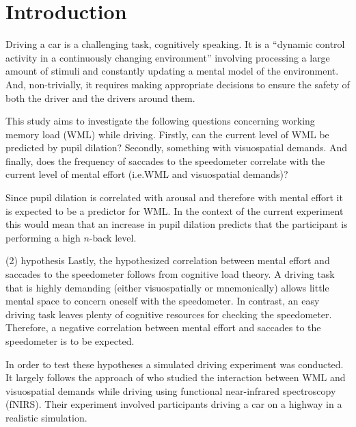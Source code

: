 
\section{Introduction}\label{sec:introduction}
Driving a car is a challenging task, cognitively speaking. 
It is a ``dynamic control activity in a continuously changing environment'' \citep[p.~18]{DeWaard1996} 
involving processing a large amount of stimuli and constantly updating a mental model of the environment.
And, non-trivially, it requires making appropriate decisions to ensure the safety of both the driver and the drivers around them.





This study aims to investigate the following questions concerning working memory load (WML) while driving. 
Firstly, can the current level of WML be predicted by pupil dilation? 
Secondly, something with visuospatial demands. 
And finally, does the frequency of saccades to the speedometer correlate with the current level of mental effort (i.e.\@ WML and visuospatial demands)?\@ 

Since pupil dilation is correlated with arousal \citep{Mathot2018} and therefore with mental effort it is expected to be a predictor for WML.\@
In the context of the current experiment this would mean that an increase in pupil dilation predicts that the participant is performing a high \(n\)-back level.

(2) hypothesis
Lastly, the hypothesized correlation between mental effort and saccades to the speedometer follows from cognitive load theory.
A driving task that is highly demanding (either visuospatially or mnemonically) allows little mental space to concern oneself with the speedometer.
In contrast, an easy driving task leaves plenty of cognitive resources for checking the speedometer.
Therefore, a negative correlation between mental effort and saccades to the speedometer is to be expected.

In order to test these hypotheses a simulated driving experiment was conducted.
It largely follows the approach of \citet{Scheunemann2019} who studied the interaction between WML and visuospatial demands while driving using functional near-infrared spectroscopy (fNIRS).
Their experiment involved participants driving a car on a highway in a realistic simulation. 

